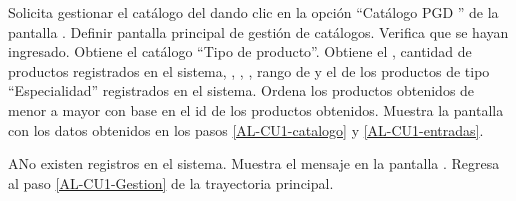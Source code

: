\begin{UseCase}




\end{UseCase}

\gdef\actor{\UCpaso[\UCactor]}
\gdef\sistema{\UCpaso[\UCsist]}

\begin{UCtrayectoria}
    \actor Solicita gestionar el catálogo del  dando clic en la opción ``Catálogo PGD '' \hspace{0.1 cm} de la pantalla . \TODO Definir pantalla principal de gestión de catálogos.
    \sistema Verifica que se hayan ingresado. 
    \UCpaso [\UCsist] \label{AL-CU1-catalogo} Obtiene el catálogo ``Tipo de producto''.
    \UCpaso [\UCsist] \label{AL-CU1-entradas} Obtiene el , cantidad de productos registrados en el sistema, , ,  , rango de  y el  de los productos de tipo ``Especialidad'' registrados en el sistema. 
    \UCpaso [\UCsist] Ordena los productos obtenidos de menor a mayor con base en el id de los productos obtenidos.
    \UCpaso [\UCsist] Muestra la pantalla  con los datos obtenidos en los pasos \ref{AL-CU1-catalogo} y \ref{AL-CU1-entradas}.

\end{UCtrayectoria}


\begin{UCtrayectoriaA}{A}{No existen registros en el sistema.}
    \UCpaso [\UCsist] Muestra el mensaje  en la pantalla .
    \UCpaso [\UCsist] Regresa al paso \ref{AL-CU1-Gestion} de la trayectoria principal.
\end{UCtrayectoriaA}


